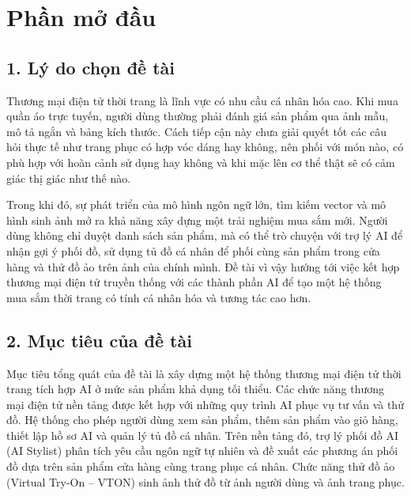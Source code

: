 \chapter*{Phần mở đầu}
{}

\section*{1. Lý do chọn đề tài}
{}

Thương mại điện tử thời trang là lĩnh vực có nhu cầu cá nhân hóa cao. Khi mua quần áo trực tuyến, người dùng thường phải đánh giá sản phẩm qua ảnh mẫu, mô tả ngắn và bảng kích thước. Cách tiếp cận này chưa giải quyết tốt các câu hỏi thực tế như trang phục có hợp vóc dáng hay không, nên phối với món nào, có phù hợp với hoàn cảnh sử dụng hay không và khi mặc lên cơ thể thật sẽ có cảm giác thị giác như thế nào.

\medskip

Trong khi đó, sự phát triển của mô hình ngôn ngữ lớn, tìm kiếm vector và mô hình sinh ảnh mở ra khả năng xây dựng một trải nghiệm mua sắm mới. Người dùng không chỉ duyệt danh sách sản phẩm, mà có thể trò chuyện với trợ lý AI để nhận gợi ý phối đồ, sử dụng tủ đồ cá nhân để phối cùng sản phẩm trong cửa hàng và thử đồ ảo trên ảnh của chính mình. Đề tài vì vậy hướng tới việc kết hợp thương mại điện tử truyền thống với các thành phần AI để tạo một hệ thống mua sắm thời trang có tính cá nhân hóa và tương tác cao hơn.

\section*{2. Mục tiêu của đề tài}
{}

Mục tiêu tổng quát của đề tài là xây dựng một hệ thống thương mại điện tử thời trang tích hợp AI ở mức sản phẩm khả dụng tối thiểu. Các chức năng thương mại điện tử nền tảng được kết hợp với những quy trình AI phục vụ tư vấn và thử đồ. Hệ thống cho phép người dùng xem sản phẩm, thêm sản phẩm vào giỏ hàng, thiết lập hồ sơ AI và quản lý tủ đồ cá nhân. Trên nền tảng đó, trợ lý phối đồ AI (AI Stylist) phân tích yêu cầu ngôn ngữ tự nhiên và đề xuất các phương án phối đồ dựa trên sản phẩm cửa hàng cùng trang phục cá nhân. Chức năng thử đồ ảo (Virtual Try-On -- VTON) sinh ảnh thử đồ từ ảnh người dùng và ảnh trang phục.


